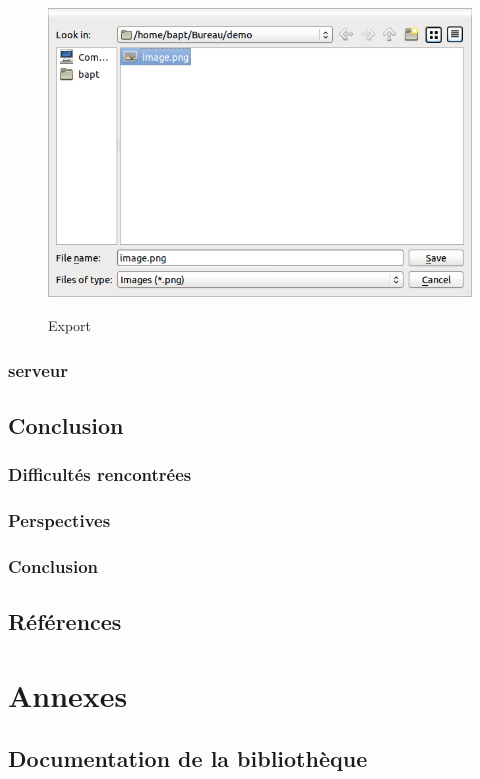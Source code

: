 \documentclass{report}
\begin{document}
				\begin{figure}[!h]
						\centering
						\includegraphics[scale=0.4]{../images/export.png}\\
						\caption{Export}
						\label{Export}
				\end{figure}
				\newpage
		\section{serveur}
		
	
	\chapter{Conclusion}
		\section{Difficultés rencontrées}
		\section{Perspectives}
		\section{Conclusion}
	
	\chapter{Références}
	
	\part{Annexes}
	\appendix
		\chapter{Documentation de la bibliothèque}
\end{document}
